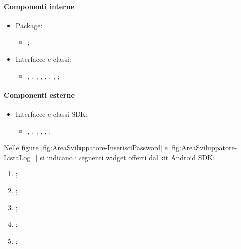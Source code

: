 \documentclass[../Funzionalita.tex]{subfiles}
\begin{document}
			\paragraph*{Componenti interne}
			\begin{itemize}
			
				\item Package:
				\begin{itemize}
					\item[] \view;
				\end{itemize}
				
				\item Interfacce e classi:
				\begin{itemize}
					\item[] \MainDeveloperViewImp, 
					\MainDeveloperView, \DeveloperUnlockerViewImp, \DeveloperUnlockerView, 
					\LoggingViewImp, \LoggingView, 
					\LogInformationViewImp, \LogInformationView;
				\end{itemize}
				
			\end{itemize}
			
			
			\paragraph*{Componenti esterne}
			\begin{itemize}
				\item Interfacce e classi SDK:
				\begin{itemize}
					\item[] \EditText, \Button, \FloatingActionButton, \ListView, \TextView, \Toolbar;
				\end{itemize}
			\end{itemize}
			
			
			Nelle figure \ref{fig:AreaSviluppatore-InserisciPassword} e \ref{fig:AreaSviluppatore-ListaLog_} si indicano i seguenti widget offerti dal kit Android SDK:
			\begin{enumerate}
				\item \EditText;
				\item \Button;
				\item \Toolbar;
				\item \ListView;
				\item \FloatingActionButton;
			\end{enumerate}
			
\end{document}
